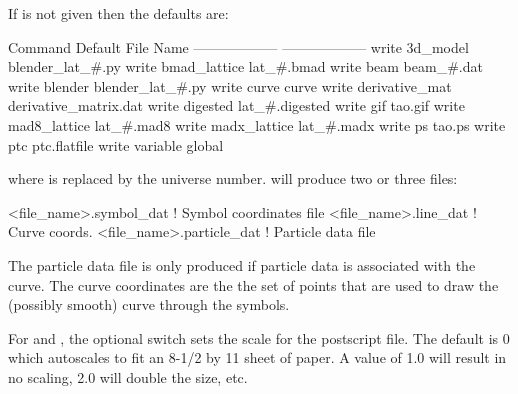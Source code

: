 {{{{{{\vskip 7pt 

If  is not given then the defaults are:
\begin{example}
  Command                        Default File Name
  ------------------             ------------------
  write 3d_model                 blender_lat_#.py
  write bmad_lattice             lat_#.bmad
  write beam                     beam_#.dat
  write blender                  blender_lat_#.py
  write curve                    curve
  write derivative_mat           derivative_matrix.dat              
  write digested                 lat_#.digested
  write gif                      tao.gif
  write mad8_lattice             lat_#.mad8
  write madx_lattice             lat_#.madx
  write ps                       tao.ps
  write ptc                      ptc.flatfile
  write variable                 global%
\end{example}
where \vn{\#} is replaced by the universe number.  will produce two or
three files:
\begin{example}
  <file_name>.symbol_dat    ! Symbol coordinates file
  <file_name>.line_dat      ! Curve coords.
  <file_name>.particle_dat  ! Particle data file
\end{example}
The particle data file is only produced if particle data is associated with the curve.
The curve coordinates are the the set of points that are used to draw the (possibly
smooth) curve through the symbols.

For  and , the optional  switch sets the scale for the
postscript file. The default is 0 which autoscales to fit an 8-1/2 by 11 sheet of paper. A
value of 1.0 will result in no scaling, 2.0 will double the size, etc.

}}}}}}
